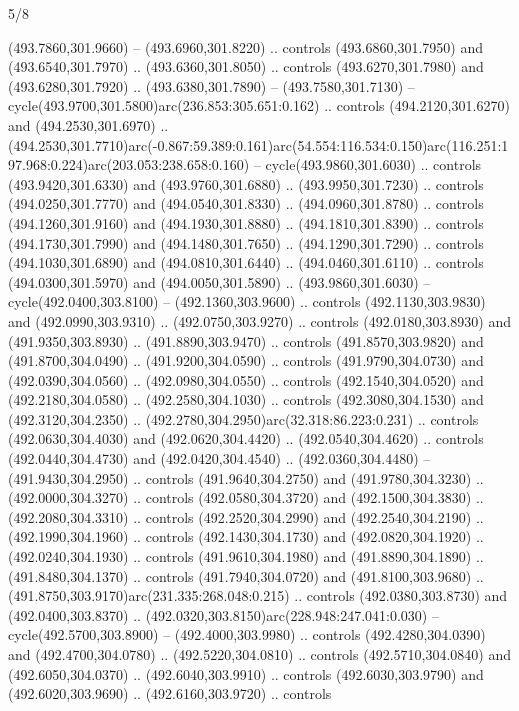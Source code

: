 \begin{flagdescription}{5/8}
\begin{scope}[xshift=0.5\flaglength,yshift=0.5\flagwidth,scale=\flagwidth/475.63]
\begin{scope}[y=0.8pt, x=0.8pt, yscale=-1, xscale=1,shift={(-450,-300)}]
\begin{scope}[cm={{1.0,0.0,0.0,1.0,(-0.0002,0.12556)}},cm={{1.0,0.0,0.0,1.0,(0.00179,0.0)}}]
\begin{scope}[cm={{1.11592,0.0,0.0,1.11592,(-106.89933,-41.77764)}}]
\begin{scope}[draw=black,fill=cfff]
\begin{scope}[fill=black]
  (493.7860,301.9660) -- (493.6960,301.8220) .. controls (493.6860,301.7950) and
  (493.6540,301.7970) .. (493.6360,301.8050) .. controls (493.6270,301.7980) and
  (493.6280,301.7920) .. (493.6380,301.7890) -- (493.7580,301.7130) --
  cycle(493.9700,301.5800)arc(236.853:305.651:0.162) .. controls
  (494.2120,301.6270) and (494.2530,301.6970) ..
  (494.2530,301.7710)arc(-0.867:59.389:0.161)arc(54.554:116.534:0.150)arc(116.251:197.968:0.224)arc(203.053:238.658:0.160)
  -- cycle(493.9860,301.6030) .. controls (493.9420,301.6330) and
  (493.9760,301.6880) .. (493.9950,301.7230) .. controls (494.0250,301.7770) and
  (494.0540,301.8330) .. (494.0960,301.8780) .. controls (494.1260,301.9160) and
  (494.1930,301.8880) .. (494.1810,301.8390) .. controls (494.1730,301.7990) and
  (494.1480,301.7650) .. (494.1290,301.7290) .. controls (494.1030,301.6890) and
  (494.0810,301.6440) .. (494.0460,301.6110) .. controls (494.0300,301.5970) and
  (494.0050,301.5890) .. (493.9860,301.6030) -- cycle(492.0400,303.8100) --
  (492.1360,303.9600) .. controls (492.1130,303.9830) and (492.0990,303.9310) ..
  (492.0750,303.9270) .. controls (492.0180,303.8930) and (491.9350,303.8930) ..
  (491.8890,303.9470) .. controls (491.8570,303.9820) and (491.8700,304.0490) ..
  (491.9200,304.0590) .. controls (491.9790,304.0730) and (492.0390,304.0560) ..
  (492.0980,304.0550) .. controls (492.1540,304.0520) and (492.2180,304.0580) ..
  (492.2580,304.1030) .. controls (492.3080,304.1530) and (492.3120,304.2350) ..
  (492.2780,304.2950)arc(32.318:86.223:0.231) .. controls (492.0630,304.4030)
  and (492.0620,304.4420) .. (492.0540,304.4620) .. controls (492.0440,304.4730)
  and (492.0420,304.4540) .. (492.0360,304.4480) -- (491.9430,304.2950) ..
  controls (491.9640,304.2750) and (491.9780,304.3230) .. (492.0000,304.3270) ..
  controls (492.0580,304.3720) and (492.1500,304.3830) .. (492.2080,304.3310) ..
  controls (492.2520,304.2990) and (492.2540,304.2190) .. (492.1990,304.1960) ..
  controls (492.1430,304.1730) and (492.0820,304.1920) .. (492.0240,304.1930) ..
  controls (491.9610,304.1980) and (491.8890,304.1890) .. (491.8480,304.1370) ..
  controls (491.7940,304.0720) and (491.8100,303.9680) ..
  (491.8750,303.9170)arc(231.335:268.048:0.215) .. controls (492.0380,303.8730)
  and (492.0400,303.8370) .. (492.0320,303.8150)arc(228.948:247.041:0.030) --
  cycle(492.5700,303.8900) -- (492.4000,303.9980) .. controls
  (492.4280,304.0390) and (492.4700,304.0780) .. (492.5220,304.0810) .. controls
  (492.5710,304.0840) and (492.6050,304.0370) .. (492.6040,303.9910) .. controls
  (492.6030,303.9790) and (492.6020,303.9690) .. (492.6160,303.9720) .. controls

\end{scope}
\end{scope}
\end{scope}
\end{scope}
\end{scope}
\end{scope}
\end{flagdescription}
